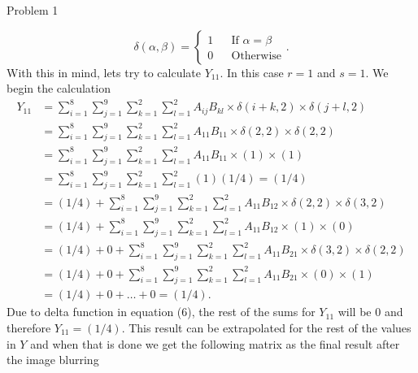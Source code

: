 \begin{problem}{Problem 1}
\begin{highlight}[Solution]
        \begin{equation}
            \delta(\alpha,\beta) = \left\{
                \begin{aligned}
                    1 & & \text{If $\alpha = \beta$} \\
                    0 & & \text{Otherwise}
                \end{aligned}
            \right. .
        \end{equation}
        With this in mind, lets try to calculate $Y_{11}$. In this case $r = 1$ and $s = 1$. We begin the calculation
        \begin{align}
            Y_{11} & = \sum_{i = 1}^{8}\sum_{j = 1}^{9}\sum_{k = 1}^{2}\sum_{l = 1}^{2} A_{ij}B_{kl} \times \delta(i + k, 2) \times \delta(j + l, 2) \\
            & = \sum_{i = 1}^{8}\sum_{j = 1}^{9}\sum_{k = 1}^{2}\sum_{l = 1}^{2} A_{11}B_{11} \times \delta(2, 2) \times \delta(2, 2) \\
            & = \sum_{i = 1}^{8}\sum_{j = 1}^{9}\sum_{k = 1}^{2}\sum_{l = 1}^{2} A_{11}B_{11} \times (1) \times (1) \\
            & = \sum_{i = 1}^{8}\sum_{j = 1}^{9}\sum_{k = 1}^{2}\sum_{l = 1}^{2} (1)(1/4) = (1/4) \\
            & = (1/4) + \sum_{i = 1}^{8}\sum_{j = 1}^{9}\sum_{k = 1}^{2}\sum_{l = 1}^{2} A_{11}B_{12} \times \delta(2, 2) \times \delta(3, 2) \\
            & = (1/4) + \sum_{i = 1}^{8}\sum_{j = 1}^{9}\sum_{k = 1}^{2}\sum_{l = 1}^{2} A_{11}B_{12} \times (1) \times (0) \\
            & = (1/4) + 0 + \sum_{i = 1}^{8}\sum_{j = 1}^{9}\sum_{k = 1}^{2}\sum_{l = 1}^{2} A_{11}B_{21} \times \delta(3, 2) \times \delta(2, 2) \\
            & = (1/4) + 0 + \sum_{i = 1}^{8}\sum_{j = 1}^{9}\sum_{k = 1}^{2}\sum_{l = 1}^{2} A_{11}B_{21} \times (0) \times (1) \\
            & = (1/4) + 0 + \dots + 0 = (1/4).
        \end{align}
        Due to delta function in equation (6), the rest of the sums for $Y_{11}$ will be 0 and therefore $Y_{11} = (1/4)$. This result can be extrapolated for the rest of the values in $Y$ and when that
        is done we get the following matrix as the final result after the image blurring


\end{highlight}
\end{problem}
